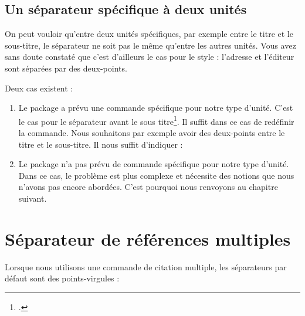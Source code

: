     \begin{latexcode}
\renewcommand{\newunitpunct}[0]{\addcomma\addspace}
    \end{latexcode}
    

    
\subsection{Un séparateur spécifique à deux unités}
    
    On peut vouloir qu'entre deux unités spécifiques, par exemple entre le titre et le sous-titre, le séparateur ne soit pas le même qu'entre les autres unités.    Vous avez sans doute constaté que c'est d'ailleurs le cas pour le style  : l'adresse et l'éditeur sont séparées par des deux-points.
    
    Deux cas existent :
        \begin{enumerate}
            \item Le package  a prévu une commande spécifique pour notre type d'unité. C'est le cas pour le séparateur avant le sous titre\footcite[Ces commandes sont peu nombreuses : on les trouvera dans][]{biblatex_hooks}. Il suffit dans ce cas de redéfinir la commande. Nous souhaitons par exemple avoir des deux-points entre le titre et le sous-titre. Il nous suffit d'indiquer :
            
            \begin{latexcode}
\renewcommand{\subtitlepunct}[0]{\addspace\addcolon\addspace}
            \end{latexcode}

            
            \item Le package n'a pas prévu de commande spécifique pour notre type d'unité. Dans ce cas, le problème est plus complexe et nécessite des notions que nous n'avons pas encore abordées. C'est pourquoi nous renvoyons au  chapitre suivant.
        \end{enumerate}
        
\section{Séparateur de références multiples}\label{multicitedelim}

Lorsque nous utilisons une commande de citation multiple, les séparateurs par défaut sont des points-virgules :


\begin{latexcode}
\autocites{Saxer1980}{Junod1992}
\end{latexcode}

